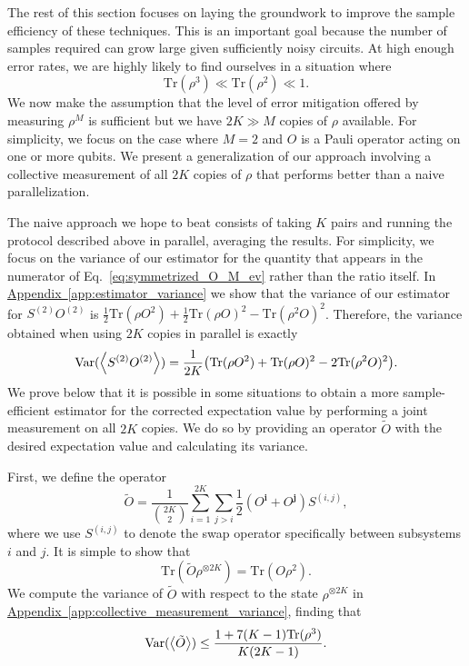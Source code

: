 \documentclass[
amsmath,
amssymb,
aps,
pra,
reprint,
twocolumn,
superscriptaddress,
longbibliography,
showkeys,
floatfix
]{revtex4-1}
\def\tr{\mathrm{Tr}}
\newcommand{\eq}[1]{Eq.~\hyperref[eq:#1]{\ref*{eq:#1}}}
\newcommand{\app}[1]{\hyperref[app:#1]{Appendix~\ref*{app:#1}}}
\begin{document}
The rest of this section focuses on laying the groundwork to improve the sample
efficiency of these techniques. 
This is an important goal because the number of samples required can grow large
given sufficiently noisy circuits. 
At high enough error rates, we are highly likely to find ourselves in a
situation where
\begin{equation}
  \tr(\rho^3) \ll \tr(\rho^2) \ll 1.
\end{equation}
We now make the assumption that the level of error mitigation offered by
measuring \(\rho^M\) is sufficient but we have \(2K \gg M\) copies of \(\rho\)
available. 
For simplicity, we focus on the case where \(M=2\) and \(O\) is a Pauli operator
acting on one or more qubits.
We present a generalization of our approach involving a collective measurement
of all \(2K\) copies of \(\rho\) that performs better than a naive
parallelization.

The naive approach we hope to beat consists of taking \(K\) pairs and running the protocol described above in parallel, averaging
the results. 
For simplicity, we focus on the variance of our
estimator for the quantity that appears in the numerator of
\eq{symmetrized_O_M_ev} rather than the ratio itself.
In \app{estimator_variance} we show that the variance of our estimator for
\(S^{(2)}O^{(2)}\) is \(\frac{1}{2}\tr(\rho O^2) + \frac{1}{2}\tr(\rho O)^2 -
\tr(\rho^2 O) ^2 \). 
Therefore, the variance obtained when using \(2K\) copies in parallel is exactly
\begin{equation}
  \textrm{Var}(\ev{S^{(2)}O^{(2)}}) = \frac{1}{2K} \big(\tr(\rho O^2) + \tr(\rho O)^2 - 2 \tr(\rho^2 O)^2\big).
\end{equation}
We prove below that it is possible in some situations to obtain a more
sample-efficient estimator for the corrected expectation value by performing a
joint measurement on all \(2K\) copies. 
We do so by providing an operator \(\tilde{O}\) with the desired
expectation value and calculating its variance.

First, we define the operator
\begin{equation}
  \tilde{O} = \frac{1}{\binom{2K}{2}}\sum_{i=1}^{2K} \sum_{j > i}\frac{1}{2}( O^\textbf{i} + O^\textbf{j})S^{{(i, j)}},
\end{equation}
where we use \(S^{(i, j)}\) to denote the swap operator specifically between subsystems \(i\)
and \(j\).
It is simple to show that
\begin{equation}
  \tr(\tilde{O} \rho^{\otimes 2K}) = \tr(O \rho^2).
\end{equation}
We compute the variance of \(\tilde{O}\) with respect to the state
\(\rho^{\otimes 2K}\) in \app{collective_measurement_variance}, finding that
\begin{equation}
  \label{eq:variance_inequality_win}
  \textrm{Var}(\ev{\tilde{O}}) \leq \frac{1 + 7 (K-1) \tr(\rho^3)}{K(2K-1)}.
\end{equation}
\end{document}
